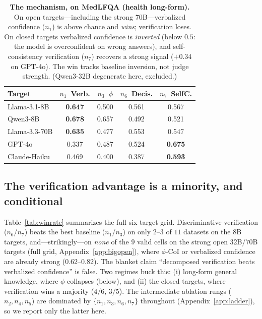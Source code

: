 \documentclass[11pt]{article}
\newcommand{\nverb}{$n_1$}     %
\newcommand{\nphi}{$n_3$}      %
\newcommand{\nyn}{$n_6$}       %
\newcommand{\nsc}{$n_7$}       %
\begin{document}
\begin{table}[t]
\centering\small
\begin{tabular}{lcccc}
\toprule
Target & \nverb\ Verb. & \nphi\ $\phi$ & \nyn\ Decis. & \nsc\ SelfC. \\
\midrule
Llama-3.1-8B  & \textbf{0.647} & 0.500 & 0.561 & 0.567 \\
Qwen3-8B      & \textbf{0.678} & 0.657 & 0.492 & 0.521 \\
Llama-3.3-70B & \textbf{0.635} & 0.477 & 0.553 & 0.547 \\
GPT-4o        & 0.337 & 0.487 & 0.524 & \textbf{0.675} \\
Claude-Haiku  & 0.469 & 0.400 & 0.387 & \textbf{0.593} \\
\bottomrule
\end{tabular}
\caption{\textbf{The mechanism, on MedLFQA (health long-form).} On open targets---including
the strong 70B---verbalized confidence (\nverb) is above chance and \emph{wins}; verification
loses. On closed targets verbalized confidence is \emph{inverted} (below $0.5$: the model is
overconfident on wrong answers), and self-consistency verification (\nsc) recovers a strong
signal ($+0.34$ on GPT-4o). The win tracks baseline inversion, not judge strength.
(Qwen3-32B degenerate here, excluded.)}
\label{tab:medlfqa}
\end{table}

\subsection{The verification advantage is a minority, and conditional}
Table~\ref{tab:winrate} summarizes the full six-target grid. Discriminative verification
(\nyn/\nsc) beats the best baseline (\nverb/\nphi) on only $2$--$3$ of $11$ datasets on the
8B targets, and---strikingly---on \emph{none} of the $9$ valid cells on the strong open
32B/70B targets (full grid, Appendix~\ref{app:bigopen}), where $\phi$-CoI or verbalized
confidence are already strong ($0.62$--$0.82$).
The blanket claim ``decomposed verification beats verbalized confidence'' is false. Two
regimes buck this: (i) long-form general knowledge, where $\phi$ collapses (below), and
(ii) the closed targets, where verification wins a majority ($4/6$, $3/5$). The intermediate
ablation rungs ($n_2,n_4,n_5$) are dominated by $\{n_1,n_3,n_6,n_7\}$ throughout
(Appendix~\ref{app:ladder}), so we report only the latter here.
\end{document}
